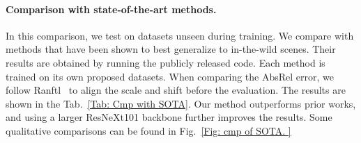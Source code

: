 \begin{table*}[t]
\setlength{\tabcolsep}{2pt}
\caption{Quantitative comparison of our depth prediction with state-of-the-art methods on eight zero-shot (unseen during training) datasets. Our method achieves better performance than existing state-of-the-art methods across all test datasets. \label{Tab: Cmp with SOTA}}
\vspace{-1.5em}
\end{table*}



\paragraph{Comparison with state-of-the-art methods.}
In this comparison, we test on datasets unseen during training.
We compare with methods that have been shown to best generalize to in-the-wild scenes. Their results are obtained by running the publicly released code. Each method is trained on its own proposed datasets.
When comparing the AbsRel error, we follow Ranftl~\cite{Ranftl2020} to align the scale and shift before the evaluation. 
The results are shown in the Tab.~\ref{Tab: Cmp with SOTA}. Our method outperforms prior works, and using a larger ResNeXt101 backbone further improves the results. Some qualitative comparisons can be found in Fig.~\ref{Fig: cmp of SOTA. }



